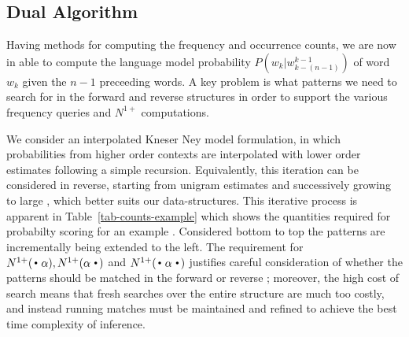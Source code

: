 \subsection{Dual \CST Algorithm} 

Having methods for computing the frequency and occurrence
counts, we are now in able to compute the \ngram language model
probability $P(w_k | w^{k-1}_{k-(n-1)})$ of word $w_k$ given the $n-1$
preceeding words. A key problem is what patterns we need to search for
in the forward and reverse \CST structures in order to support the
various frequency queries and $N^{1+}$ computations. 

We consider an interpolated Kneser Ney model formulation, in which
probabilities from higher order contexts are interpolated with lower
order estimates following a simple recursion. 
Equivalently, this iteration can be considered in reverse, starting from unigram
estimates and successively growing to large \ngrams, which better
suits our \CST data-structures.
This iterative process is apparent in Table~\ref{tab-counts-example} which
shows the quantities required for probabilty scoring for an example \ngram.
Considered bottom to top the patterns are incrementally being extended
to the left.
The requirement for $\nlplus{\dotpat}, \nlplus{\patdot}$ and
$\nlplus{\dotpatdot}$ justifies careful consideration of whether the
patterns should be matched in the forward or reverse \CST; moreover,
the high cost of search means that fresh searches over the entire
structure are much too costly, and instead running matches must be
maintained and refined to achieve the best time complexity of inference. 

